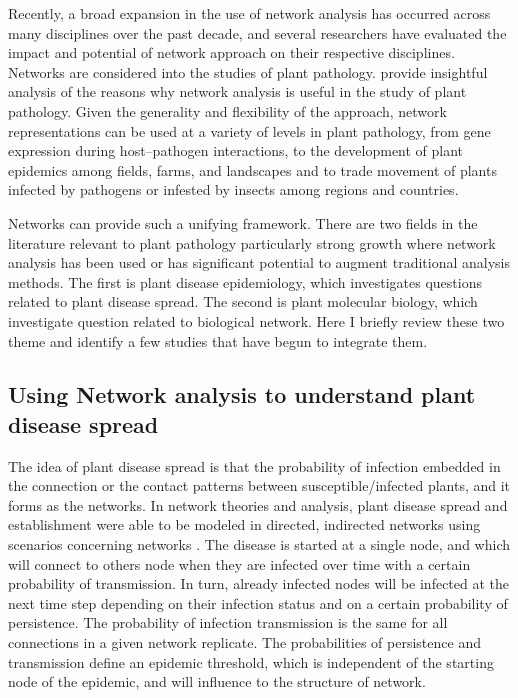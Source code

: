 Recently, a broad expansion in the use of network analysis has occurred across many disciplines over the past decade, and several researchers have evaluated the impact and potential of network approach on their respective disciplines. Networks are considered into the studies of plant pathology.  provide insightful analysis of the reasons why network analysis is useful in the study of plant pathology. Given the generality and flexibility of the approach, network representations can be used at a variety of levels in plant pathology, from gene expression during host–pathogen interactions, to the development of plant epidemics among fields, farms, and landscapes and to trade movement of plants infected by pathogens or infested by insects among regions and countries. 

Networks can provide such a unifying framework. There are two fields in the literature relevant to plant pathology particularly strong growth where network analysis has been used or has significant potential to augment traditional analysis methods. The first is plant disease epidemiology, which investigates questions related to plant disease spread. The second is plant molecular biology, which investigate question related to biological network. Here I briefly review these two theme and identify a few studies that have begun to integrate them.


\subsection*{Using Network analysis to understand plant disease spread}

The idea of plant disease spread is that the probability of infection embedded in the connection or the contact patterns between susceptible/infected plants, and it forms as the networks. In network theories and analysis,  plant disease spread and establishment were able to be modeled in directed, indirected networks using scenarios concerning networks . The disease is started at a single node, and which will connect to others node when they are infected over time with a certain probability of transmission. In turn, already infected nodes will be infected at the next time step depending on their infection status and on a certain probability of persistence. The probability of infection transmission is the same for all connections in a given network replicate. The probabilities of persistence and transmission define an epidemic threshold, which is independent of the starting node of the epidemic, and will influence to the structure of network. 

